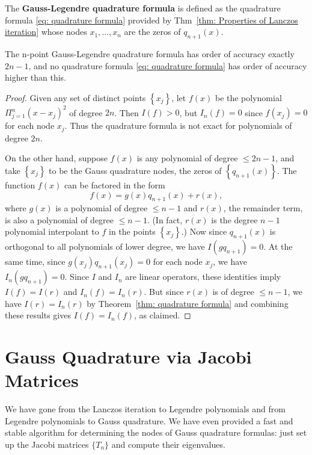  The \textbf{Gauss-Legendre quadrature formula} is defined as the quadrature formula \eqref{eq: quadrature formula} provided by Thm~\ref{thm: Properties of Lanczos iteration} whose nodes $ x_1, \ldots ,x_n $ are the zeros of $ q_{n+1}(x) $.  

 
 \begin{theorem}
 \label{thm: Accuracy of Gauss-Legendre quadrature}
 The n-point Gauss-Legendre quadrature formula has order of accuracy exactly $2 n-1$, and no quadrature formula \eqref{eq: quadrature formula} has order of accuracy higher than this.
 \end{theorem}
 \begin{proof}
 Given any set of distinct points $\left\{x_j\right\}$, let $f(x)$ be the polynomial $\Pi_{j=1}^n\left(x-x_j\right)^2$ of degree $2 n$. Then $I(f)>0$, but $I_n(f)=0$ since $f\left(x_j\right)=0$ for each node $x_j$. Thus the quadrature formula is not exact for polynomials of degree $2 n$.

On the other hand, suppose $f(x)$ is any polynomial of degree $\leq 2 n-1$, and take $\left\{x_j\right\}$ to be the Gauss quadrature nodes, the zeros of $\left\{q_{n+1}(x)\right\}$. The function $f(x)$ can be factored in the form
$$
f(x)=g(x) q_{n+1}(x)+r(x),
$$
where $g(x)$ is a polynomial of degree $\leq n-1$ and $r(x)$, the remainder term, is also a polynomial of degree $\leq n-1$. (In fact, $r(x)$ is the degree $n-1$ polynomial interpolant to $f$ in the points $\left\{x_j\right\}$.) Now since $q_{n+1}(x)$ is orthogonal to all polynomials of lower degree, we have $I\left(g q_{n+1}\right)=0$. At the same time, since $g\left(x_j\right) q_{n+1}\left(x_j\right)=0$ for each node $x_j$, we have $I_n\left(g q_{n+1}\right)=0$. Since $I$ and $I_n$ are linear operators, these identities imply $I(f)=I(r)$ and $I_n(f)=I_n(r)$. But since $r(x)$ is of degree $\leq n-1$, we have $I(r)=I_n(r)$ by Theorem~\ref{thm: quadrature formula} and combining these results gives $I(f)=I_n(f)$, as claimed.
 \end{proof}
 
 \section{Gauss Quadrature via Jacobi Matrices} 
 We have gone from the Lanczos iteration to Legendre polynomials and from Legendre polynomials to Gauss quadrature. We have even provided a fast and stable algorithm for determining the nodes of Gauss quadrature formulas: just set up the Jacobi matrices $ \{T_n\}  $ and compute their eigenvalues. 


